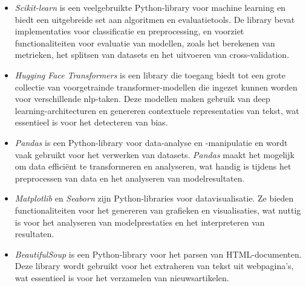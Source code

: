 \begin{itemize}
    \item \textit{Scikit-learn} is een veelgebruikte Python-library voor machine learning en biedt een uitgebreide set aan algoritmen en evaluatietools. De library bevat implementaties voor classificatie en preprocessing, en voorziet functionaliteiten voor evaluatie van modellen, zoals het berekenen van metrieken, het splitsen van datasets en het uitvoeren van cross-validation.
    \item \textit{Hugging Face Transformers} is een library die toegang biedt tot een grote collectie van voorgetrainde transformer-modellen die ingezet kunnen worden voor verschillende \gls{nlp}-taken. Deze modellen maken gebruik van deep learning-architecturen en genereren contextuele representaties van tekst, wat essentieel is voor het detecteren van bias.
    \item \textit{Pandas} is een Python-library voor data-analyse en -manipulatie en wordt vaak gebruikt voor het verwerken van datasets. \textit{Pandas} maakt het mogelijk om data efficiënt te transformeren en analyseren, wat handig is tijdens het preprocessen van data en het analyseren van modelresultaten.
    \item \textit{Matplotlib} en \textit{Seaborn} zijn Python-libraries voor datavisualisatie. Ze bieden functionaliteiten voor het genereren van grafieken en visualisaties, wat nuttig is voor het analyseren van modelprestaties en het interpreteren van resultaten.
    \item \textit{BeautifulSoup} is een Python-library voor het parsen van HTML-documenten. Deze library wordt gebruikt voor het extraheren van tekst uit webpagina's, wat essentieel is voor het verzamelen van nieuwsartikelen.
\end{itemize}